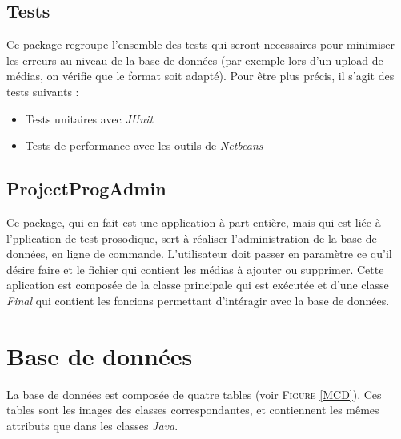 \subsection{Tests}

Ce package regroupe l'ensemble des tests qui seront necessaires pour minimiser les erreurs au niveau de la base de données (par exemple lors d'un upload de médias, on vérifie que le format soit adapté). Pour être plus précis, il s'agit des tests suivants :
\begin{itemize}
 \item Tests unitaires avec \textit{JUnit}
 \item Tests de performance avec les outils de \textit{Netbeans}
\end{itemize}


\subsection{ProjectProgAdmin}

Ce package, qui en fait est une application à part entière, mais qui est liée à l'pplication de test prosodique, sert à réaliser l'administration de la base de données, en ligne de commande. L'utilisateur doit passer en paramètre ce qu'il désire faire et le fichier qui contient les médias à ajouter ou supprimer.
Cette aplication est composée de la classe principale qui est exécutée et d'une classe \textit{Final} qui contient les foncions permettant d'intéragir avec la base de données.

\section{Base de données}

La base de données est composée de quatre tables (voir \textsc{Figure} \ref{MCD}). Ces tables sont les images des classes correspondantes, et contiennent les mêmes attributs que dans les classes \textit{Java}.

